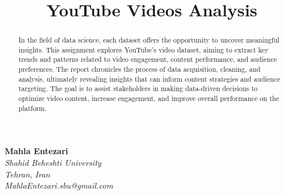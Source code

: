 \documentclass[a4paper]{article}
\title{
    \textbf{YouTube Videos Analysis} 
}
\date{} %
\begin{document}
\maketitle
\vspace{-1.5cm}

\begin{center}
    \textbf{Mahla Entezari}\\
    \textit{Shahid Beheshti University}\\
    \textit{Tehran, Iran}\\
    \textit{MahlaEntezari.sbu@gmail.com}
    \vfill
\end{center}


\begin{abstract}
In the field of data science, each dataset offers the opportunity to uncover meaningful insights. This assignment explores YouTube's video dataset, aiming to extract key trends and patterns related to video engagement, content performance, and audience preferences.
The report chronicles the process of data acquisition, cleaning, and analysis, ultimately revealing insights that can inform content strategies and audience targeting. The goal is to assist stakeholders in making data-driven decisions to optimize video content, increase engagement, and improve overall performance on the platform. 
\end{abstract}


\singlespacing
\setlength{\parskip}{6pt}
\setlength{\parindent}{0.5cm}
\end{document}
